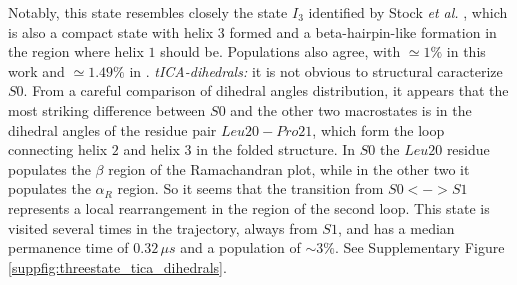 \documentclass[prl,twocolumn]{revtex4-1}
\begin{document}
Notably, this state resembles closely the state $I_3$ identified by Stock \textit{et al.} \cite{hierarchical_hp35}, which is also a compact state with helix $3$ formed and a beta-hairpin-like formation in the region where helix $1$ should be. Populations also agree, with $\simeq 1\%$ in this work and $\simeq 1.49\%$ in \cite{hierarchical_hp35}. 
\vspace*{0.1em}\newline
\textit{tICA-dihedrals:} it is not obvious to structural caracterize $S0$. From a careful comparison of dihedral angles distribution, it appears that the
most striking difference between $S0$ and the other two macrostates is in the dihedral angles of the residue pair $Leu20-Pro21$, which form the loop connecting helix $2$ and helix $3$ in the folded structure. In $S0$ the $Leu20$ residue populates the $\beta$ region of the Ramachandran plot, while in the
other two it populates the $\alpha_R$ region. So it seems that the transition from $S0<->S1$ represents a local rearrangement in the region of the second loop. This state is visited several times in the trajectory, always from $S1$, and 
has a median permanence time of $0.32\, \mu s$ and a population of $\sim 3\%$. See Supplementary Figure \ref{suppfig:threestate_tica_dihedrals}. 

%
%

%
%
%
%
%
%

%

\FloatBarrier
\end{document}
